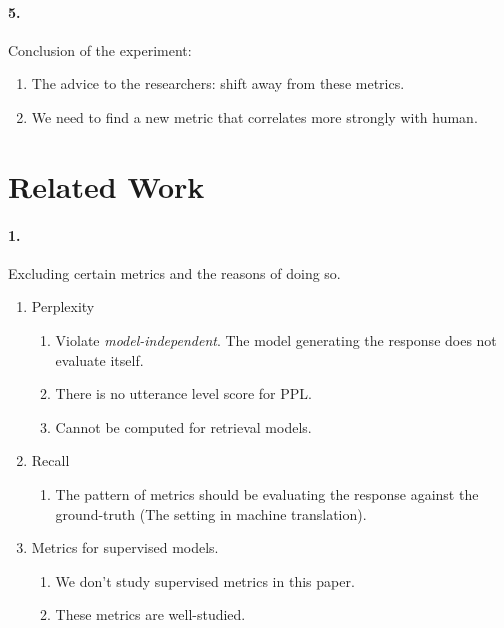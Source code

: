 \documentclass[runningheads]{llncs}
\begin{document}
\paragraph{5. } Conclusion of the experiment:
\begin{enumerate}
    \item The advice to the researchers: shift away from these metrics.
    \item We need to find a new metric that correlates more strongly with human.
\end{enumerate}

\section{Related Work}
\paragraph{1. } Excluding certain metrics and the reasons of doing so.
\begin{enumerate}
    \item Perplexity
    \begin{enumerate}
        \item Violate \emph{model-independent}. The model generating the response
        does not evaluate itself.
        \item There is no utterance level score for PPL.
        \item Cannot be computed for retrieval models.
    \end{enumerate}
    \item Recall
    \begin{enumerate}
        \item The pattern of metrics should be evaluating the response against the
        ground-truth (The setting in machine translation).
    \end{enumerate}
    \item Metrics for supervised models.
    \begin{enumerate}
        \item We don't study supervised metrics in this paper.
        \item These metrics are well-studied.
    \end{enumerate}
\end{enumerate}
\end{document}
